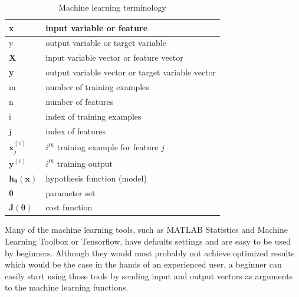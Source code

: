 \begin{table}
\caption{Machine learning terminology}
\label{arm:machineLearningTerminology}
\begin{center}
\begin{tabular}{||l|l||}\hline
x & input variable or feature \\\hline
y & output variable or target variable \\\hline
\textbf{X} & input variable vector or feature vector \\\hline
\textbf{y} & output variable vector or target variable vector \\\hline
m & number of training examples \\\hline
n & number of features \\\hline
i & index of training examples \\\hline
j & index of features \\\hline
$\textbf{x}_j^{(i)}$ & $i^{th}$ training example for feature $j$ \\\hline
$\textbf{y}^{(i)}$ & $i^{th}$ training output  \\\hline
$\textbf{h}_{\bm{\theta}}(\textbf{x})$ &hypothesis function (model)\\\hline
$\bm{\theta}$ &parameter set\\\hline
$\textbf{J}({\bm{\theta}})$ &cost function  \\\hline

\end{tabular}
\end{center}
\end{table}

Many of the machine learning tools, such as MATLAB Statistics and Machine Learning Toolbox or Tensorflow, have defaults settings and are easy to be used by beginners. 
Although they would most probably not achieve optimized results which would be the case in the hands of an experienced user, a beginner can easily start using those tools by sending input and output vectors as arguments to the machine learning functions. 

